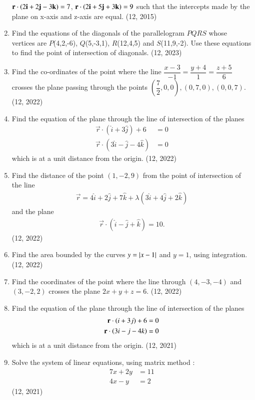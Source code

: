 \begin{enumerate}[label=\thesubsection.\arabic*, ref=\thesubsection.\theenumi]
$\mathbf{r}\cdot\left(2\mathbf{i}+2\mathbf{j}-3\mathbf{k}\right)=7$, \quad $\mathbf{r}\cdot\left(2\mathbf{i}+5\mathbf{j}+3\mathbf{k}\right)=9$
such that the intercepts made by the plane on x-axis and z-axis are equal. \hfill (12, 2015)
\item Find the equations of the diagonals of the parallelogram $PQRS$ whose vertices are $P$(4,2,-6), $Q$(5,-3,1), $R$(12,4,5) and $S$(11,9,-2). Use these equations to find the point of intersection of diagonals. \hfill (12, 2023)
\item Find the co-ordinates of the point where the line $\dfrac{x-3}{-1}=\dfrac{y+4}{1}=\dfrac{z+5}{6}$ crosses the plane passing through the points $\left(\dfrac{7}{2},0,0\right),(0,7,0),(0,0,7)$. \hfill (12, 2022)

\item Find the equation of the plane through the line of intersection of the planes
	\begin{align}
		\vec{r}\cdot(\hat{i}+3\hat{j})+6&=0\\
		\vec{r}\cdot(3\hat{i}-\hat{j}-4\hat{k})&=0
	\end{align}
	which is at a unit distance from the origin. \hfill (12, 2022)
\item Find the distance of the point $(1,-2, 9)$ from the point of intersection of the line
	\begin{align}
		\vec{r}=4\hat{i}+2\hat{j}+7\hat{k}+\lambda(3\hat{i}+4\hat{j}+2\hat{k})
	\end{align}
	and the plane
	\begin{align}
		\vec{r}\cdot(\hat{i}-\hat{j}+\hat{k})=10.
	\end{align}
\hfill (12, 2022)

\item Find the area bounded by the curves $y=\left\vert x-1\right\vert$ and $y=1$, using integration. \hfill (12, 2022)

\item Find the coordinates of the point where the line through $(4,-3,-4)$ and $(3,-2,2)$ crosses the plane $2x+y+z=6$. \hfill (12, 2022)
\item Find the equation of the plane through the line of intersection of the planes 
\begin{align}
  \mathbf{r} \cdot \left(i+3j\right) + 6 &= 0 \\  
  \mathbf{r} \cdot \left(3i - j - 4k\right) &= 0
\end{align}
which is at a unit distance from the origin. \hfill (12, 2021)
\item Solve the system of linear equations, using matrix method : 
\begin{align}
  7x + 2y &= 11\\
  4x - y &= 2
\end{align}
\hfill (12, 2021)
\end{enumerate}
